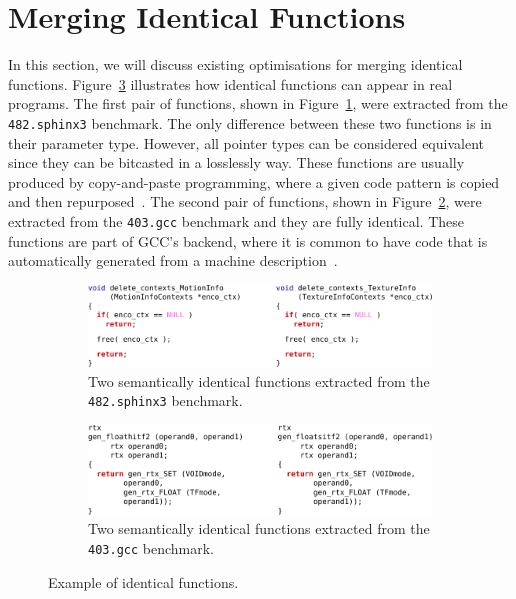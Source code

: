 \section{Merging Identical Functions}

In this section, we will discuss existing optimisations for merging identical functions.
Figure~\ref{fig:example-identical} illustrates how identical functions can appear in real programs.
The first pair of functions, shown in Figure~\ref{fig:example-identical-1-sphinx3}, were extracted from the \texttt{482.sphinx3} benchmark.
The only difference between these two functions is in their parameter type.
However, all pointer types can be considered equivalent since they can be bitcasted in a losslessly way.
These functions are usually produced by copy-and-paste programming, where a given code pattern is copied and then repurposed~\cite{kim04,jablonski10,ahmed15}.
The second pair of functions, shown in Figure~\ref{fig:example-identical-2-gcc}, were extracted from the \texttt{403.gcc} benchmark and they are fully identical.
These functions are part of GCC's backend, where it is common to have code that is automatically generated from a machine description~\cite{muchnick98,kolek13,ghica15}.

\begin{figure}[h]
\centering
\begin{subfigure}{\textwidth}
\centering
\includegraphics[scale=0.9]{src/relatedwork/figs/example-identical-1-sphinx3}
\caption{Two semantically identical functions extracted from the \texttt{482.sphinx3} benchmark.}
\label{fig:example-identical-1-sphinx3}
\end{subfigure}
\begin{subfigure}{\textwidth}
\centering
\includegraphics[scale=0.9]{src/relatedwork/figs/example-identical-2-gcc}
\caption{Two semantically identical functions extracted from the \texttt{403.gcc} benchmark.}
\label{fig:example-identical-2-gcc}
\end{subfigure}
\caption{Example of identical functions.}
\label{fig:example-identical}
\end{figure}

